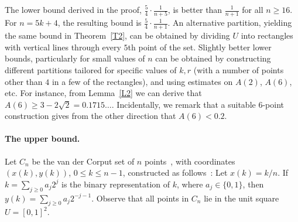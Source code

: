 \documentclass[11pt]{article}
\begin{document}
The lower bound derived in the proof, $\frac{5}{4} \cdot \frac{1}{n+5}$, is
better than $\frac{1}{n+1}$ for all $n \geq 16$. For $n=5k+4$,
the resulting bound is $\frac{5}{4} \cdot \frac{1}{n+1}$. 
An alternative partition, yielding the same bound in Theorem~\ref{T2},
can be obtained by dividing $U$ into rectangles with vertical lines
through every $5$th point of the set. Slightly better lower
bounds, particularly 
for small values of $n$ can be obtained by constructing different
partitions tailored for specific values of $k,r$ (with a number of
points other than $4$ in a few of the rectangles), and using estimates
on $A(2)$, $A(6)$, etc.  For instance, from Lemma~\ref{L2} we can derive that 
$A(6) \geq 3 - 2\sqrt{2}=0.1715\ldots$. 
Incidentally, we remark that a suitable $6$-point construction gives
from the other direction that $A(6)<0.2$. 


\paragraph{The upper bound.}
Let $C_n$ be the van der Corput set of $n$ points~\cite{C35a,C35b},
with coordinates $(x(k), y(k))$, $0 \le k \le n-1$, constructed as
follows~\cite{Ch00,Ma99}: Let $x(k) = k/n$.
If $k=\sum_{j \ge 0} a_j 2^j$ is the binary representation of $k$,
where $a_j \in \{0,1\}$, then $y(k) = \sum_{j\ge 0} a_j 2^{-j-1}$.
Observe that all points in $C_n$ lie in the unit square $U=[0,1]^2$.
\end{document}
